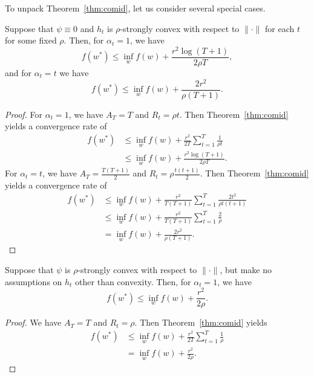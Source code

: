 \documentclass[paper.tex]{subfiles}
\begin{document}
To unpack Theorem~\ref{thm:comid}, let us consider several special cases.
\begin{corollary}
Suppose that $\psi \equiv 0$ and $h_t$ is $\rho$-strongly convex with respect to 
$\|\cdot\|$ for each $t$ for some fixed $\rho$. Then, for $\alpha_t = 1$, we have
\[ f(w^*) \leq \inf_w f(w) + \frac{r^2 \log(T+1)}{2\rho T}, \]
and for $\alpha_t = t$ we have
\[ f(w^*) \leq \inf_w f(w) + \frac{2r^2}{\rho (T+1)}. \]
\end{corollary}
\begin{proof}
For $\alpha_t = 1$, we have $A_T = T$ and $R_t = \rho t$. Then Theorem~\ref{thm:comid} 
yields a convergence rate of
\begin{align*}
f(w^*) &\leq \inf_w f(w) + \frac{r^2}{2T} \sum_{t=1}^T \frac{1}{\rho t} \\
 &\leq \inf_w f(w) + \frac{r^2 \log(T+1)}{2\rho T}.
\end{align*}
For $\alpha_t = t$, we have $A_T = \frac{T(T+1)}{2}$ and $R_t = \rho \frac{t(t+1)}{2}$. 
Then Theorem~\ref{thm:comid} yields a convergence rate of
\begin{align*}
f(w^*) &\leq \inf_w f(w) + \frac{r^2}{T(T+1)} \sum_{t=1}^T \frac{2t^2}{\rho t(t+1)} \\
 &\leq \inf_w f(w) + \frac{r^2}{T(T+1)} \sum_{t=1}^T \frac{2}{\rho} \\
 &= \inf_w f(w) + \frac{2r^2}{\rho (T+1)}.
\end{align*}
\end{proof}

\begin{corollary}
Suppose that $\psi$ is $\rho$-strongly convex with respect to $\|\cdot\|$, but make 
no assumptions on $h_t$ other than convexity. Then, for $\alpha_t = 1$, we have
\[ f(w^*) \leq \inf_w f(w) + \frac{r^2}{2\rho}. \]
\end{corollary}
\begin{proof}
We have $A_T = T$ and $R_t = \rho$. Then Theorem~\ref{thm:comid} yields
\begin{align*}
f(w^*) &\leq \inf_w f(w) + \frac{r^2}{2T} \sum_{t=1}^T \frac{1}{\rho} \\
 &= \inf_w f(w) + \frac{r^2}{2\rho}.
\end{align*}
\end{proof}

\end{document}
